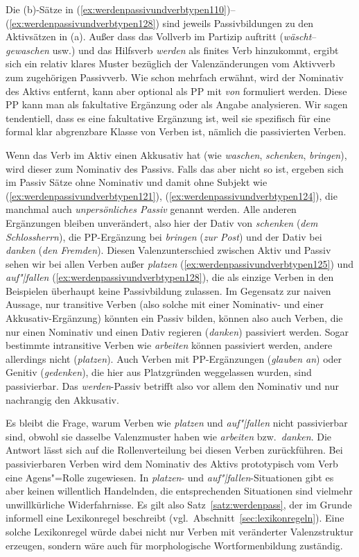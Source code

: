 Die (b)-Sätze in (\ref{ex:werdenpassivundverbtypen110})--(\ref{ex:werdenpassivundverbtypen128}) sind jeweils Passivbildungen zu den Aktivsätzen in (a).
Außer dass das Vollverb im Partizip auftritt (\textit{wäscht}--\textit{gewaschen} usw.) und das Hilfsverb \textit{werden} als finites Verb hinzukommt, ergibt sich ein relativ klares Muster bezüglich der Valenzänderungen vom Aktivverb zum zugehörigen Passivverb.
Wie schon mehrfach erwähnt, wird der Nominativ des Aktivs entfernt, kann aber optional als PP mit \textit{von} formuliert werden.
Diese PP kann man als fakultative Ergänzung oder als Angabe analysieren.
Wir sagen tendentiell, dass es eine fakultative Ergänzung ist, weil sie spezifisch für eine formal klar abgrenzbare Klasse von Verben ist, nämlich die passivierten Verben.

Wenn das Verb im Aktiv einen Akkusativ hat (wie \textit{waschen}, \textit{schenken}, \textit{bringen}), wird dieser zum Nominativ des Passivs.
Falls das aber nicht so ist, ergeben sich im Passiv Sätze ohne Nominativ und damit ohne Subjekt wie (\ref{ex:werdenpassivundverbtypen121}), (\ref{ex:werdenpassivundverbtypen124}), die manchmal auch \textit{unpersönliches Passiv} genannt werden.
Alle anderen Ergänzungen bleiben unverändert, also hier der Dativ von \textit{schenken} (\textit{dem Schlossherrn}), die PP-Ergänzung bei \textit{bringen} (\textit{zur Post}) und der Dativ bei \textit{danken} (\textit{den Fremden}).
Diesen Valenzunterschied zwischen Aktiv und Passiv sehen wir bei allen Verben außer \textit{platzen} (\ref{ex:werdenpassivundverbtypen125}) und \textit{auf"|fallen} (\ref{ex:werdenpassivundverbtypen128}), die als einzige Verben in den Beispielen überhaupt keine Passivbildung zulassen.
Im Gegensatz zur naiven Aussage, nur transitive Verben (also solche mit einer Nominativ- und einer Akkusativ-Ergänzung) könnten ein Passiv bilden, können also \zB auch Verben, die nur einen Nominativ und einen Dativ regieren (\textit{danken}) passiviert werden.
Sogar bestimmte intransitive Verben wie \textit{arbeiten} können passiviert werden, andere allerdings nicht (\textit{platzen}).
Auch Verben mit PP-Ergänzungen (\textit{glauben an}) oder Genitiv (\textit{gedenken}), die hier aus Platzgründen weggelassen wurden, sind passivierbar.
Das \textit{werden}-Passiv betrifft also vor allem den Nominativ und nur nachrangig den Akkusativ.

Es bleibt die Frage, warum Verben wie \textit{platzen} und \textit{auf"|fallen} nicht passivierbar sind, obwohl sie dasselbe Valenzmuster haben wie \textit{arbeiten} bzw.\ \textit{danken}.
Die Antwort lässt sich auf die Rollenverteilung bei diesen Verben zurückführen.
Bei passivierbaren Verben wird dem Nominativ des Aktivs prototypisch vom Verb eine Agens"=Rolle zugewiesen.
In \textit{platzen}- und \textit{auf"|fallen}-Situationen gibt es aber keinen willentlich Handelnden, die entsprechenden Situationen sind vielmehr unwillkürliche Widerfahrnisse.
Es gilt also Satz~\ref{satz:werdenpass}, der im Grunde informell eine Lexikonregel beschreibt (vgl.\ Abschnitt~\ref{sec:lexikonregeln}).
Eine solche Lexikonregel würde dabei nicht nur Verben mit veränderter Valenzstruktur erzeugen, sondern wäre auch für morphologische Wortformenbildung zuständig.


